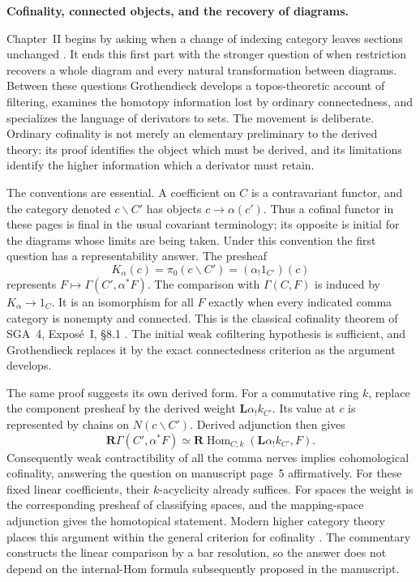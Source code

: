 \begingroup
{}
\noindent\textbf{Cofinality, connected objects, and the recovery of diagrams.}

Chapter~II begins by asking when a change of indexing category leaves sections unchanged \citep{Grothendieck1990II}. It ends this first part with the stronger question of when restriction recovers a whole diagram and every natural transformation between diagrams. Between these questions Grothendieck develops a topos-theoretic account of filtering, examines the homotopy information lost by ordinary connectedness, and specializes the language of derivators to sets. The movement is deliberate. Ordinary cofinality is not merely an elementary preliminary to the derived theory: its proof identifies the object which must be derived, and its limitations identify the higher information which a derivator must retain.

The conventions are essential. A coefficient on $C$ is a contravariant functor, and the category denoted $c\backslash C'$ has objects $c\to\alpha(c')$. Thus a cofinal functor in these pages is final in the usual covariant terminology; its opposite is initial for the diagrams whose limits are being taken. Under this convention the first question has a representability answer. The presheaf
\[
 K_\alpha(c)=\pi_0(c\backslash C')= (\alpha_!1_{C'})(c)
\]
represents $F\mapsto\Gamma(C',\alpha^*F)$. The comparison with $\Gamma(C,F)$ is induced by $K_\alpha\to1_C$. It is an isomorphism for all $F$ exactly when every indicated comma category is nonempty and connected. This is the classical cofinality theorem of SGA~4, Expos\'e~I, \S8.1 \citep{SGA4I1972}. The initial weak cofiltering hypothesis is sufficient, and Grothendieck replaces it by the exact connectedness criterion as the argument develops.

The same proof suggests its own derived form. For a commutative ring $k$, replace the component presheaf by the derived weight $\mathbf L\alpha_!k_{C'}$. Its value at $c$ is represented by chains on $N(c\backslash C')$. Derived adjunction then gives
\[
 \mathbf R\Gamma(C',\alpha^*F)
 \simeq\mathbf R\operatorname{Hom}_{C;k}
       (\mathbf L\alpha_!k_{C'},F).
\]
Consequently weak contractibility of all the comma nerves implies cohomological cofinality, answering the question on manuscript page~5 affirmatively. For these fixed linear coefficients, their $k$-acyclicity already suffices. For spaces the weight is the corresponding presheaf of classifying spaces, and the mapping-space adjunction gives the homotopical statement. Modern higher category theory places this argument within the general criterion for cofinality \citep[Theorem~4.1.3.1]{Lurie2009HTT}. The commentary constructs the linear comparison by a bar resolution, so the answer does not depend on the internal-Hom formula subsequently proposed in the manuscript.

